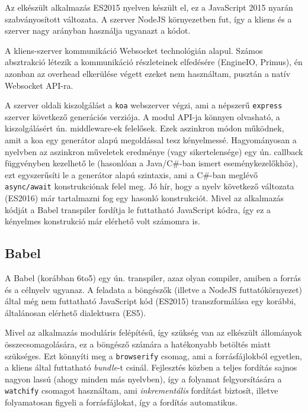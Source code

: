 \documentclass[12pt]{article}
\begin{document}
Az elkészült alkalmazás ES2015 \cite{es2015} nyelven készült el, ez a JavaScript 2015 nyarán
szabványosított változata. A szerver NodeJS \cite{node} környezetben fut, így a kliens és
a szerver nagy arányban használja ugyanazt a kódot.

A kliens-szerver kommunikáció Websocket \cite{websocket} technológián alapul.
Számos absztrakció létezik a kommunikáció részleteinek elfedésére (EngineIO, Primus),
én azonban az overhead elkerülése végett ezeket nem használtam, pusztán
a natív Websocket API-ra.

A szerver oldali kiszolgálást a \texttt{koa}\cite{koa} webszerver végzi, ami a népszerű \texttt{express}\cite{express}
szerver következő generációs verziója. A modul API-ja könnyen olvasható,
a kiszolgálásért ún. middleware-ek felelősek. Ezek aszinkron módon működnek,
amit a koa egy generátor alapú megoldással tesz kényelmessé.
Hagyományosan a nyelvben az aszinkron műveletek eredménye (vagy sikertelensége)
egy ún. callback függvényben kezelhető le (hasonlóan a Java/C\#-ban ismert eseménykezelőkhöz),
ezt egyszerűsíti le a generátor alapú szintaxis, ami a C\#-ban meglévő \texttt{async/await}\cite{csasync}
konstrukciónak felel meg. Jó hír, hogy a nyelv következő változata (ES2016) már
tartalmazni fog egy hasonló konstrukciót\cite{jsasync}.
Mivel az alkalmazás kódját a Babel transpiler fordítja le futtatható JavaScript
kódra, így ez a kényelmes konstrukció már elérhető volt számomra is.

\subsection{Babel}

A Babel\cite{babel} (korábban 6to5\cite{6to5}) egy ún. transpiler, azaz olyan compiler, amiben a forrás
és a célnyelv ugyanaz. A feladata a böngészők (illetve a NodeJS futtatókörnyezet)
által még nem futtatható JavaScript kód (ES2015) transzformálása egy korábbi,
általánosan elérhető dialektusra (ES5).

Mivel az alkalmazás moduláris felépítésű, így szükség van az elkészült állományok
összecsomagolására, ez a böngésző számára a hatékonyabb betöltés miatt szükséges.
Ezt könnyíti meg a \texttt{browserify}\cite{browserify} csomag, ami a forrásfájlokból egyetlen, a kliens
által futtatható \emph{bundle}-t csinál.
Fejlesztés közben a teljes fordítás sajnos nagyon lassú (ahogy minden más nyelvben),
így a folyamat felgyorsítására a \texttt{watchify}\cite{watchify} csomagot használtam, ami \emph{inkrementális}
fordítást biztosít, illetve folyamatosan figyeli a forrásfájlokat,
így a fordítás automatikus.
\end{document}
